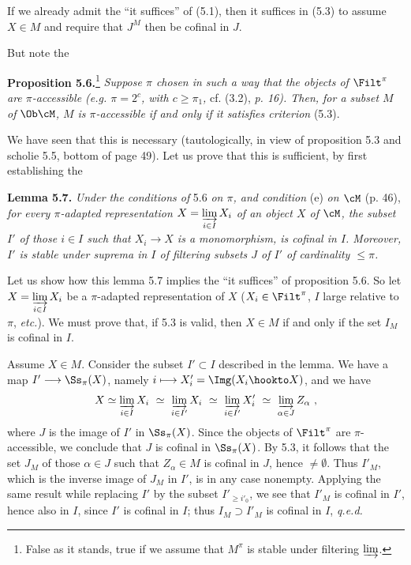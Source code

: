 If we already admit the ``it suffices'' of (5.1), then it suffices in (5.3) to assume $X \in M$ and require that $J^{M}$ then be cofinal in $J$.

But note the

\textbf{Proposition 5.6.}\footnote[21]{False as it stands, true if we assume that $M^{\pi}$ is stable under filtering $\varinjlim$.} \textit{Suppose $\pi$ chosen in such a way that the objects of} $\Filt^{\pi}$ \textit{are $\pi$-accessible (e.g. $\pi = 2^{c}$, with $c \geq \pi_1$,} cf. (3.2), \textit{p. 16). Then, for a subset $M$ of} $\Ob\cM$\textit{, $M$ is $\pi$-accessible if and only if it satisfies criterion} (5.3).

We have seen that this is necessary (tautologically, in view of proposition 5.3 and scholie 5.5, bottom of page 49). Let us prove that this is sufficient, by first establishing the

\textbf{Lemma 5.7.} \textit{Under the conditions of} 5.6 \textit{on $\pi$, and condition} (e) \textit{on $\cM$} (p. 46), \textit{for every $\pi$-adapted representation $X = \varinjlim\limits_{i\in I} X_i$ of an object $X$ of $\cM$, the subset $I'$ of those $i \in I$ such that $X_i \longrightarrow X$ is a monomorphism, is cofinal in $I$. Moreover, $I'$ is stable under suprema in $I$ of filtering subsets $J$ of $I'$ of cardinality $\leq \pi$.}

Let us show how this lemma 5.7 implies the ``it suffices'' of proposition 5.6. So let $X = \varinjlim\limits_{i\in I} X_i$ be a $\pi$-adapted representation of $X$ ($X_i \in \Filt^{\pi}$, $I$ large relative to $\pi$, \textit{etc.}). We must prove that, if 5.3 is valid, then $X \in M$ if and only if the set $I_M$ is cofinal in $I$.

Assume $X \in M$. Consider the subset $I' \subset I$ described in the lemma. We have a map $I' \longrightarrow \Ss_{\pi}(X)$, namely $i \longmapsto X'_i = \Img (X_i \hookto X)$, and we have
\[
X \simeq \varinjlim_{i\in I} X_i \ \simeq \ \varinjlim_{i\in I'} X_i \ \simeq \ \varinjlim_{i\in I'} X'_i \ \simeq \ \varinjlim_{\alpha\in J} Z_{\alpha} \ ,
\]
where $J$ is the image of $I'$ in $\Ss_{\pi}(X)$. Since the objects of $\Filt^{\pi}$ are $\pi$-accessible, we conclude that $J$ is cofinal in $\Ss_{\pi}(X)$. By 5.3, it follows that the set $J_M$ of those $\alpha \in J$
such that $Z_{\alpha} \in M$ is cofinal in $J$, hence $\neq \emptyset$. Thus $I'_M$, which is the inverse image of $J_M$ in $I'$, is in any case nonempty. Applying the same result while replacing $I'$ by the subset $I'_{\geq i'_0}$, we see that $I'_M$ is cofinal in $I'$, hence also in $I$, since $I'$ is cofinal in $I$; thus $I_M \supset I'_M$ is cofinal in $I$, \quad \textit{q.e.d.}

